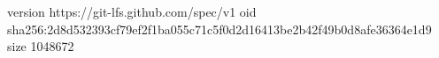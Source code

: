 version https://git-lfs.github.com/spec/v1
oid sha256:2d8d532393cf79ef2f1ba055c71c5f0d2d16413be2b42f49b0d8afe36364e1d9
size 1048672
